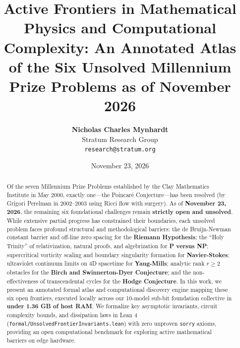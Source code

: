 \documentclass[10pt,twocolumn,letterpaper]{article}
\title{\textbf{Active Frontiers in Mathematical Physics and Computational Complexity: An Annotated Atlas of the Six Unsolved Millennium Prize Problems as of November 2026}}
\author{
  \textbf{Nicholas Charles Mynhardt} \\
  Stratum Research Group \\
  \texttt{research@stratum.org}
}
\date{November 23, 2026}
\begin{document}
\maketitle

\begin{abstract}
Of the seven Millennium Prize Problems established by the Clay Mathematics Institute in May 2000, exactly one---the Poincaré Conjecture---has been resolved (by Grigori Perelman in 2002--2003 using Ricci flow with surgery). As of \textbf{November 23, 2026}, the remaining six foundational challenges remain \textbf{strictly open and unsolved}. While extensive partial progress has constrained their boundaries, each unsolved problem faces profound structural and methodological barriers: the de Bruijn-Newman constant barrier and off-line zero spacing for the \textbf{Riemann Hypothesis}; the ``Holy Trinity'' of relativization, natural proofs, and algebrization for \textbf{P versus NP}; supercritical vorticity scaling and boundary singularity formation for \textbf{Navier-Stokes}; ultraviolet continuum limits on 4D spacetime for \textbf{Yang-Mills}; analytic rank $r \ge 2$ obstacles for the \textbf{Birch and Swinnerton-Dyer Conjecture}; and the non-effectiveness of transcendental cycles for the \textbf{Hodge Conjecture}. In this work, we present an annotated formal atlas and computational discovery engine mapping these six open frontiers, executed locally across our 10-model sub-bit foundation collective in \textbf{under 1.36 GB of host RAM}. We formalize key asymptotic invariants, circuit complexity bounds, and dissipation laws in Lean 4 (\texttt{formal/UnsolvedFrontierInvariants.lean}) with zero unproven \texttt{sorry} axioms, providing an open computational benchmark for exploring active mathematical barriers on edge hardware.
\end{abstract}
\end{document}
